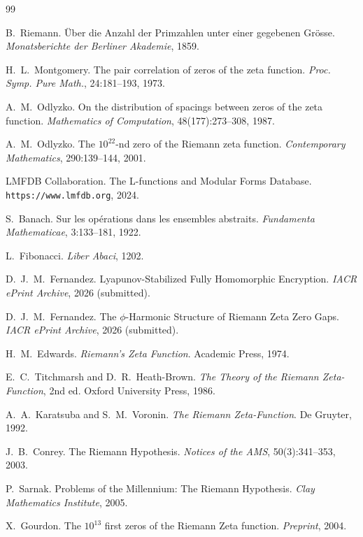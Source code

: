 \documentclass[11pt,a4paper]{article}
\begin{document}
\newpage

\begin{thebibliography}{99}

B.~Riemann.
\newblock \"Uber die Anzahl der Primzahlen unter einer gegebenen Gr\"osse.
\newblock \emph{Monatsberichte der Berliner Akademie}, 1859.

H.~L.~Montgomery.
\newblock The pair correlation of zeros of the zeta function.
\newblock \emph{Proc. Symp. Pure Math.}, 24:181--193, 1973.

A.~M.~Odlyzko.
\newblock On the distribution of spacings between zeros of the zeta function.
\newblock \emph{Mathematics of Computation}, 48(177):273--308, 1987.

A.~M.~Odlyzko.
\newblock The $10^{22}$-nd zero of the Riemann zeta function.
\newblock \emph{Contemporary Mathematics}, 290:139--144, 2001.

LMFDB Collaboration.
\newblock The L-functions and Modular Forms Database.
\newblock \texttt{https://www.lmfdb.org}, 2024.

S.~Banach.
\newblock Sur les op\'erations dans les ensembles abstraits.
\newblock \emph{Fundamenta Mathematicae}, 3:133--181, 1922.

L.~Fibonacci.
\newblock \emph{Liber Abaci}, 1202.

D.~J.~M.~Fernandez.
\newblock Lyapunov-Stabilized Fully Homomorphic Encryption.
\newblock \emph{IACR ePrint Archive}, 2026 (submitted).

D.~J.~M.~Fernandez.
\newblock The $\phi$-Harmonic Structure of Riemann Zeta Zero Gaps.
\newblock \emph{IACR ePrint Archive}, 2026 (submitted).

H.~M.~Edwards.
\newblock \emph{Riemann's Zeta Function}.
\newblock Academic Press, 1974.

E.~C.~Titchmarsh and D.~R.~Heath-Brown.
\newblock \emph{The Theory of the Riemann Zeta-Function}, 2nd ed.
\newblock Oxford University Press, 1986.

A.~A.~Karatsuba and S.~M.~Voronin.
\newblock \emph{The Riemann Zeta-Function}.
\newblock De Gruyter, 1992.

J.~B.~Conrey.
\newblock The Riemann Hypothesis.
\newblock \emph{Notices of the AMS}, 50(3):341--353, 2003.

P.~Sarnak.
\newblock Problems of the Millennium: The Riemann Hypothesis.
\newblock \emph{Clay Mathematics Institute}, 2005.

X.~Gourdon.
\newblock The $10^{13}$ first zeros of the Riemann Zeta function.
\newblock \emph{Preprint}, 2004.

\end{thebibliography}
\end{document}
